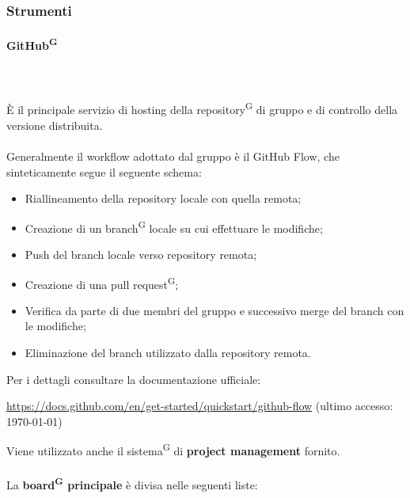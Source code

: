 \documentclass[8pt]{article}
\newcommand{\glossterm}[1]{#1\textsuperscript{G}} %
\newcommand{\subsubsubsection}[1]{\paragraph{#1}\mbox{}\\}
\begin{document}
\subsubsection{Strumenti}
\subsubsubsection{\glossterm{GitHub}}\\
È il principale servizio di hosting della \glossterm{repository} di gruppo e di controllo della versione distribuita. 
\\\\
Generalmente il workflow adottato dal gruppo è il GitHub Flow, che sinteticamente segue il seguente schema:
\begin{itemize}
  \item Riallineamento della repository locale con quella remota;
  \item Creazione di un \glossterm{branch} locale su cui effettuare le modifiche;
  \item Push del branch locale verso repository remota;
  \item Creazione di una \glossterm{pull request};
  \item Verifica da parte di due membri del gruppo e successivo merge del branch con le modifiche;
  \item Eliminazione del branch utilizzato dalla repository remota.
\end{itemize}
Per i dettagli consultare la documentazione ufficiale: 
\begin{center}
 \href{https://docs.github.com/en/get-started/quickstart/github-flow}{{https://docs.github.com/en/get-started/quickstart/github-flow}}
    (ultimo accesso: \today)
\end{center}
\medskip
Viene utilizzato anche il \glossterm{sistema} di \textbf{project management} fornito.\\\\
La \textbf{\glossterm{board} principale} è divisa nelle seguenti liste:
\end{document}
